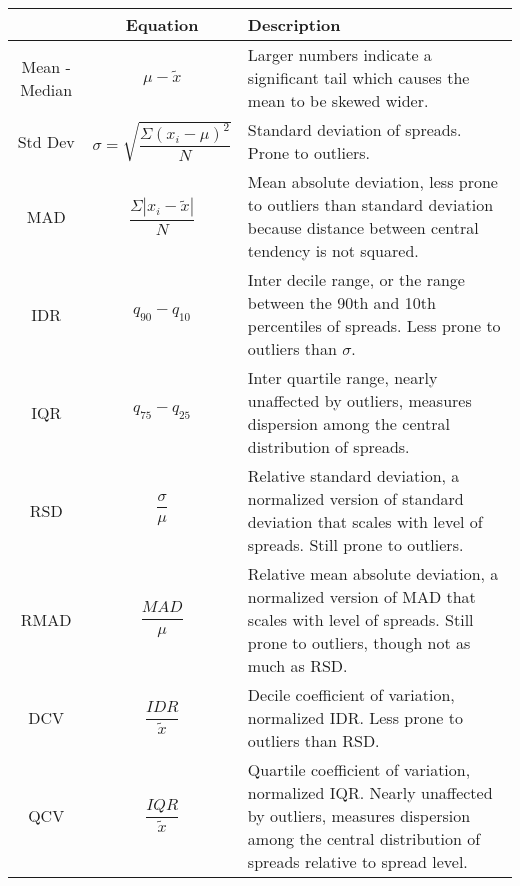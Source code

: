 \documentclass[12pt]{article}
\begin{document}
\begin{table}[H]
	\caption{}
	\centering
	\begin{tabu} to 
		\toprule
		{} &      Equation  &        Description \\
		\midrule
		Mean - Median      &  $\mu - \tilde{x}$ &  Larger numbers indicate a significant tail which causes the mean to be skewed wider. \\
			\midrule
		Std Dev        &  $\sigma = \sqrt{ \dfrac{\Sigma{ (x_i - \mu)^2}}{N}}$ & Standard deviation of spreads. Prone to outliers. \\
			\midrule
		MAD & $\dfrac{\Sigma{|x_i - \tilde{x}|}}{N}$ & Mean absolute deviation, less prone to outliers than standard deviation because distance between central tendency is not squared. \\
		    \midrule
		IDR       &  $q_{90} - q_{10}$ & Inter decile range, or the range between the 90th and 10th percentiles of spreads. Less
		prone to outliers than $\sigma$. \\
			\midrule
		IQR       &  $q_{75} - q_{25}$ & Inter quartile range, nearly unaffected by outliers, measures dispersion among the central
		distribution of spreads.\\
			\toprule

		RSD      & $\dfrac{\sigma}{\mu}$ & Relative standard deviation, a normalized version of standard deviation that scales
		with level of spreads. Still prone to outliers.   \\
			\midrule
		RMAD      & $\dfrac{MAD}{\mu}$ & Relative mean absolute deviation, a normalized version of MAD that scales with level of spreads. Still prone to outliers, though not as much as RSD.   \\
		\midrule
		DCV      & $\dfrac{IDR}{\tilde{x}}$ & Decile coefficient of variation, normalized IDR. Less prone to outliers than RSD.   \\
			\midrule
		QCV      & $\dfrac{IQR}{\tilde{x}}$ & Quartile coefficient of variation, normalized IQR. Nearly unaffected by outliers, 
		measures dispersion among the central distribution of spreads relative to spread level.   \\
		\bottomrule
	\end{tabu}
\end{table}
\end{document}
